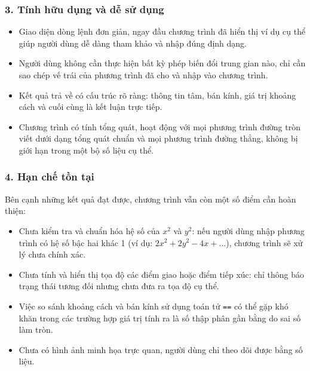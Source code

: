 \documentclass[12pt,a4paper]{article}
\begin{document}
\subsubsection*{3. Tính hữu dụng và dễ sử dụng}
\begin{itemize}
    \item Giao diện dòng lệnh đơn giản, ngay đầu chương trình đã hiển thị ví dụ cụ thể giúp người dùng dễ dàng tham khảo và nhập đúng định dạng.
    \item Người dùng không cần thực hiện bất kỳ phép biến đổi trung gian nào, chỉ cần sao chép vế trái của phương trình đã cho và nhập vào chương trình.
    \item Kết quả trả về có cấu trúc rõ ràng: thông tin tâm, bán kính, giá trị khoảng cách và cuối cùng là kết luận trực tiếp.
    \item Chương trình có tính tổng quát, hoạt động với mọi phương trình đường tròn viết dưới dạng tổng quát chuẩn và mọi phương trình đường thẳng, không bị giới hạn trong một bộ số liệu cụ thể.
\end{itemize}

\subsubsection*{4. Hạn chế tồn tại}
Bên cạnh những kết quả đạt được, chương trình vẫn còn một số điểm cần hoàn thiện:
\begin{itemize}
    \item Chưa kiểm tra và chuẩn hóa hệ số của $x^{2}$ và $y^{2}$: nếu người dùng nhập phương trình có hệ số bậc hai khác 1 (ví dụ: $2x^{2}+2y^{2}-4x+...$), chương trình sẽ xử lý chưa chính xác.
    \item Chưa tính và hiển thị tọa độ các điểm giao hoặc điểm tiếp xúc: chỉ thông báo trạng thái tương đối nhưng chưa đưa ra tọa độ cụ thể.
    \item Việc so sánh khoảng cách và bán kính sử dụng toán tử \texttt{==} có thể gặp khó khăn trong các trường hợp giá trị tính ra là số thập phân gần bằng do sai số làm tròn.
    \item Chưa có hình ảnh minh họa trực quan, người dùng chỉ theo dõi được bằng số liệu.
\end{itemize}
\end{document}
